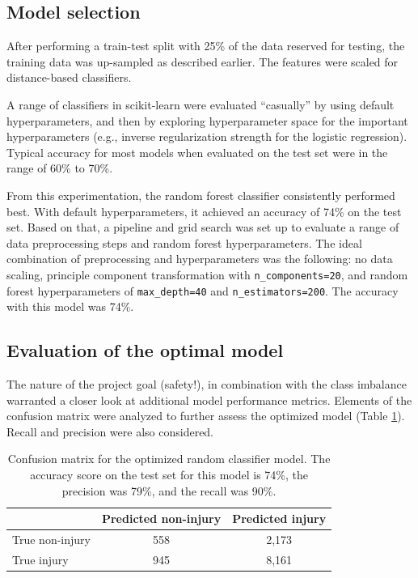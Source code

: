 \documentclass[twocolumn,oneside]{article}
\begin{document}
\subsection{Model selection}

After performing a train-test split with 25\% of the data reserved for
testing, the training data was up-sampled as described earlier.  The
features were scaled for distance-based classifiers.

A range of classifiers in scikit-learn were evaluated ``casually'' by
using default hyperparameters, and then by exploring hyperparameter
space for the important hyperparameters (e.g., inverse regularization
strength for the logistic regression).  Typical accuracy for most
models when evaluated on the test set were in the range of 60\% to
70\%.

From this experimentation, the random forest classifier consistently
performed best.  With default hyperparameters, it achieved an accuracy
of 74\% on the test set.  Based on that, a pipeline and grid search
was set up to evaluate a range of data preprocessing steps and random
forest hyperparameters.  The ideal combination of preprocessing and
hyperparameters was the following: no data scaling, principle
component transformation with \verb+n_components=20+, and random
forest hyperparameters of \verb+max_depth=40+ and
\verb+n_estimators=200+.  The accuracy with this model was 74\%.

\subsection{Evaluation of the optimal model}

The nature of the project goal (safety!), in combination with the
class imbalance warranted a closer look at additional model
performance metrics.  Elements of the confusion matrix were analyzed
to further assess the optimized model (Table \ref{tab:confusion}).
Recall and precision were also considered.

\begin{table}[h]
  \centering
\begin{tabular}{lcc}
\hline
{} &  Predicted non-injury &  Predicted injury \\
\hline
True non-injury &     558 & 2,173 \\
True injury     &     945 & 8,161 \\
\hline
\end{tabular}
\caption{Confusion matrix for the optimized random classifier model.
  The accuracy score on the test set for this model is 74\%, the
  precision was 79\%, and the recall was 90\%.}
\label{tab:confusion}
\end{table}
\end{document}
